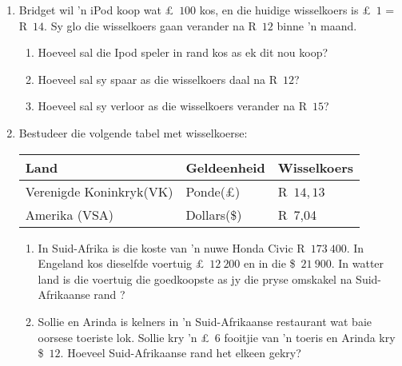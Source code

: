 \begin{exercises}{}
{
    \begin{enumerate}[itemsep=6pt, label=\textbf{\arabic*}.]
	\item Bridget wil ’n iPod koop wat £~$100$ kos, en die huidige wisselkoers is £~$1$ = R~$14$. Sy glo die wisselkoers gaan verander na R~$12$ binne ’n maand.
	\begin{enumerate}
	    \item Hoeveel sal die Ipod speler in rand kos as ek dit nou koop?
	    \item Hoeveel sal sy spaar as die wisselkoers daal na R~$12$?
	    \item Hoeveel sal sy verloor as die wisselkoers verander na R~$15$?
	\end{enumerate}

	\item Bestudeer die volgende tabel met wisselkoerse:
	\begin{center}
	    \begin{tabular}{ |l|l|l| }
		\hline
		Land	&	Geldeenheid 	&	Wisselkoers\\ \hline
		Verenigde Koninkryk(VK) 	&	Ponde(£)	&	R~$14,13$\\ \hline
		Amerika (VSA) 	&	Dollars(\$)	&	R~7,04\\ \hline
	    \end{tabular}
	\end{center}
	
	\begin{enumerate}
	    \item In Suid-Afrika is die koste van ’n nuwe Honda Civic R~$173~400$. In Engeland kos dieselfde voertuig £~$12~200$ en in die \$~$21~900$. In watter land is die voertuig die goedkoopste as jy die pryse
omskakel na Suid-Afrikaanse rand ?

	    \item Sollie en Arinda is kelners in ’n Suid-Afrikaanse restaurant wat baie oorsese toeriste lok. Sollie kry ’n £~$6$ fooitjie van ’n toeris en Arinda kry \$~$12$.  Hoeveel Suid-Afrikaanse rand het elkeen gekry?
	\end{enumerate}
    \end{enumerate}
}
\end{exercises}


